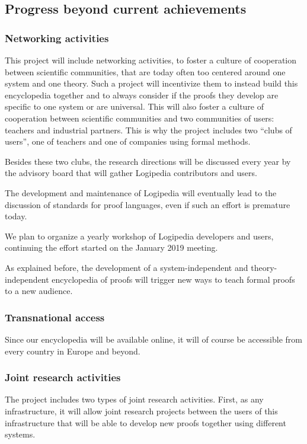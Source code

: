 \subsection{Progress beyond current achievements}


\subsubsection{Networking activities}
This project will include networking activities, to foster a culture
of cooperation between scientific communities, that are today often
too centered around one system and one theory. Such a project
will incentivize them to instead build this encyclopedia together and to always
consider if the proofs they develop are specific to one system or are
universal. This will also foster a culture of cooperation between
scientific communities and two communities of users: teachers and
industrial partners. This is why the project includes two ``clubs of
users'', one of teachers and one of companies using formal methods.

Besides these two clubs, the research directions will be discussed every
year by the advisory board that will gather {\sc Logipedia} contributors
and users.

The development and maintenance of {\sc Logipedia} will eventually lead
to the discussion of standards for proof languages, even if such an
effort is premature today.

We plan to organize a yearly workshop of {\sc Logipedia} developers
and users, continuing the effort started on the January 2019 meeting.

As explained before, the development of a system-independent and
theory-independent encyclopedia of proofs will trigger new
ways to teach formal proofs to a new audience.


\subsubsection{Transnational access}
Since our encyclopedia will be available online, it will of course be
accessible from every country in Europe and beyond.


\subsubsection{Joint research activities}
The project includes two types of joint research activities.  First,
as any infrastructure, it will allow joint research projects
between the users of this infrastructure that will be able to develop
new proofs together using different systems.

